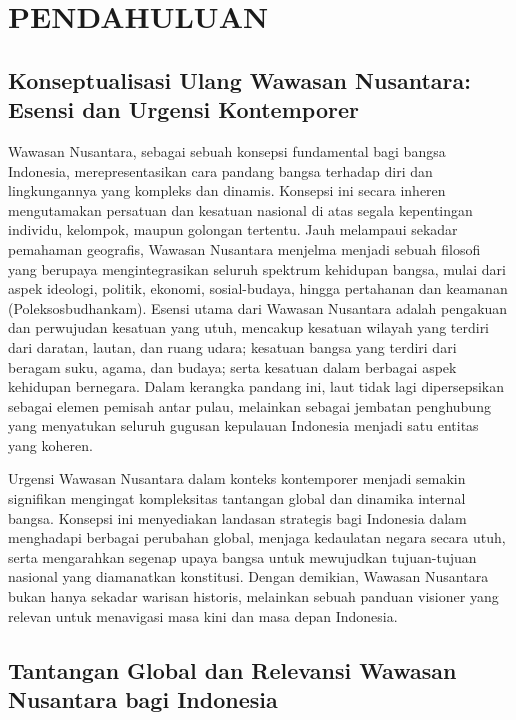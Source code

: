 \documentclass[12pt, a4paper]{article}
\begin{document}
\section{PENDAHULUAN}
\setlength{\parindent}{1em}
\justifying

\subsection*{Konseptualisasi Ulang Wawasan Nusantara: Esensi dan Urgensi Kontemporer}

Wawasan Nusantara, sebagai sebuah konsepsi fundamental bagi bangsa Indonesia, merepresentasikan cara pandang bangsa terhadap diri dan lingkungannya yang kompleks dan dinamis. Konsepsi ini secara inheren mengutamakan persatuan dan kesatuan nasional di atas segala kepentingan individu, kelompok, maupun golongan tertentu. Jauh melampaui sekadar pemahaman geografis, Wawasan Nusantara menjelma menjadi sebuah filosofi yang berupaya mengintegrasikan seluruh spektrum kehidupan bangsa, mulai dari aspek ideologi, politik, ekonomi, sosial-budaya, hingga pertahanan dan keamanan (Poleksosbudhankam). Esensi utama dari Wawasan Nusantara adalah pengakuan dan perwujudan kesatuan yang utuh, mencakup kesatuan wilayah yang terdiri dari daratan, lautan, dan ruang udara; kesatuan bangsa yang terdiri dari beragam suku, agama, dan budaya; serta kesatuan dalam berbagai aspek kehidupan bernegara. Dalam kerangka pandang ini, laut tidak lagi dipersepsikan sebagai elemen pemisah antar pulau, melainkan sebagai jembatan penghubung yang menyatukan seluruh gugusan kepulauan Indonesia menjadi satu entitas yang koheren.  

Urgensi Wawasan Nusantara dalam konteks kontemporer menjadi semakin signifikan mengingat kompleksitas tantangan global dan dinamika internal bangsa. Konsepsi ini menyediakan landasan strategis bagi Indonesia dalam menghadapi berbagai perubahan global, menjaga kedaulatan negara secara utuh, serta mengarahkan segenap upaya bangsa untuk mewujudkan tujuan-tujuan nasional yang diamanatkan konstitusi. Dengan demikian, Wawasan Nusantara bukan hanya sekadar warisan historis, melainkan sebuah panduan visioner yang relevan untuk menavigasi masa kini dan masa depan Indonesia.  

\subsection*{Tantangan Global dan Relevansi Wawasan Nusantara bagi Indonesia}
\end{document}
